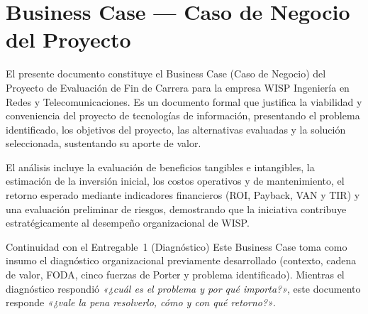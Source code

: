\chapter{Business Case — Caso de Negocio del Proyecto}
\label{chap:businesscase}



El presente documento constituye el Business Case (Caso de Negocio) del Proyecto
de Evaluación de Fin de Carrera para la empresa WISP Ingeniería en Redes y
Telecomunicaciones. Es un documento formal que justifica la viabilidad y
conveniencia del proyecto de tecnologías de información, presentando el problema
identificado, los objetivos del proyecto, las alternativas evaluadas y la solución
seleccionada, sustentando su aporte de valor.

El análisis incluye la evaluación de beneficios tangibles e intangibles, la
estimación de la inversión inicial, los costos operativos y de mantenimiento, el
retorno esperado mediante indicadores financieros (ROI, Payback, VAN y TIR) y una
evaluación preliminar de riesgos, demostrando que la iniciativa contribuye
estratégicamente al desempeño organizacional de WISP.

\begin{upeubox}{Continuidad con el Entregable~1 (Diagnóstico)}
Este Business Case toma como insumo el diagnóstico organizacional previamente
desarrollado (contexto, cadena de valor, FODA, cinco fuerzas de Porter y problema
identificado). Mientras el diagnóstico respondió \emph{«¿cuál es el problema y por
qué importa?»}, este documento responde \emph{«¿vale la pena resolverlo, cómo y con
qué retorno?»}.
\end{upeubox}

